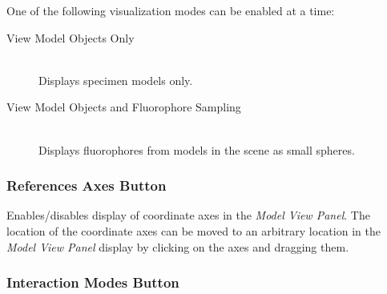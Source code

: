 \documentclass[11pt,titlepage,twoside]{article}
\begin{document}
One of the following visualization modes can be enabled at a time:

\begin{description}

  \item[View Model Objects Only] \hfill \\
  Displays specimen models only.

  \item[View Model Objects and Fluorophore Sampling] \hfill \\
  Displays fluorophores from models in the scene as small spheres.


  
  
  
\end{description}
  
\subsubsection{References Axes Button}

Enables/disables display of coordinate axes in the \emph{Model View Panel}. The location of the coordinate axes can be moved to an arbitrary location in the \emph{Model View Panel} display by clicking on the axes and dragging them.
  
\subsubsection{Interaction Modes Button}
\label{sec:InteractionModesButton}
  
\end{document}
